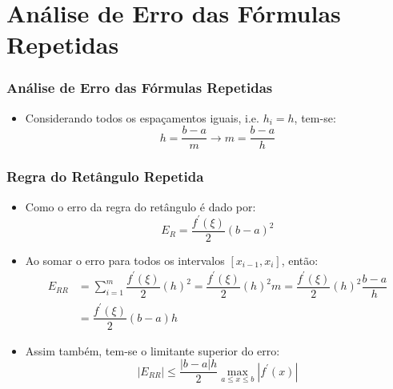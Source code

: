 \documentclass{beamer}
\theoremstyle{mystyle}
\begin{document}
\section{Análise de Erro das Fórmulas Repetidas}

\begin{frame}
	\frametitle{Análise de Erro das Fórmulas Repetidas}
	\begin{itemize}
		\item  Considerando todos os espaçamentos iguais, i.e. $ h_{i} = h $, tem-se:
		\begin{equation*}
			h = \dfrac{b - a}{m} \rightarrow m = \dfrac{b - a}{h}
		\end{equation*}
	\end{itemize}
\end{frame}

\begin{frame}
	\frametitle{Regra do Retângulo Repetida}
	\begin{itemize}
		\item Como o erro da regra do retângulo é dado por:
		\begin{equation*}
			E_{R} = \dfrac{f^{\prime}(\xi)}{2}(b - a)^{2}
		\end{equation*}
		\item Ao somar o erro para todos os intervalos $ [x_{i-1}, x_{i}] $, então:
		\begin{align*}
			E_{RR} &= \sum_{i=1}^{m}\dfrac{f^{\prime}(\xi)}{2}(h)^{2} = \dfrac{f^{\prime}(\xi)}{2}(h)^{2}m = \dfrac{f^{\prime}(\xi)}{2}(h)^{2}\dfrac{b - a}{h}\\
			&= \dfrac{f^{\prime}(\xi)}{2}(b - a)h
		\end{align*}
		\item Assim também, tem-se o limitante superior do erro:
		\begin{equation*}
			|E_{RR}| \leq \dfrac{|b - a|h}{2}\max_{a \leq x \leq b}|f^{\prime}(x)|
		\end{equation*}
	\end{itemize}
\end{frame}
\end{document}
